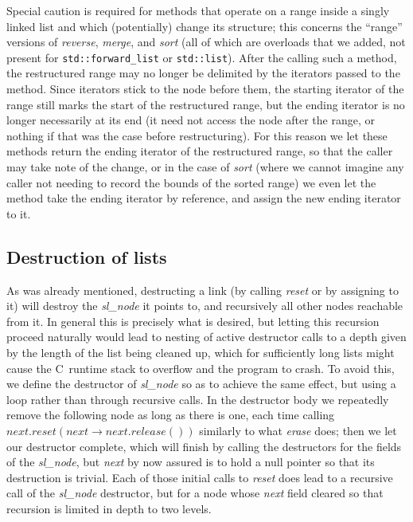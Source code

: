 \documentclass[12pt]{article}
\theoremstyle{plain}
\theoremstyle{definition}
\def\PP{\copy\PPbox}
\newcommand\Cee{\textsc{C}}
\newcommand\Cpp{\Cee\PP}
\newcommand\std[1]{\texttt{std::#1}}
\def\frwl.{\std{forward\_list}}
\begin{document}
Special caution is required for methods that operate on a range inside a singly
linked list and which (potentially) change its structure; this concerns the
``range'' versions of \textit{reverse}, \textit{merge}, and \textit{sort} (all
of which are overloads that we added, not present for \frwl. or \std{list}).
After the calling such a method, the restructured range may no longer be
delimited by the iterators passed to the method. Since iterators stick to the
node before them, the starting iterator of the range still marks the start of
the restructured range, but the ending iterator is no longer necessarily at its
end (it need not access the node after the range, or nothing if that was the
case before restructuring). For this reason we let these methods return the
ending iterator of the restructured range, so that the caller may take note of
the change, or in the case of \textit{sort} (where we cannot imagine any caller
not needing to record the bounds of the sorted range) we even let the method
take the ending iterator by reference, and assign the new ending iterator to it.


\subsection{Destruction of lists}

As was already mentioned, destructing a link (by calling \textit{reset} or by
assigning to it) will destroy the \textit{sl\_node} it points to, and
recursively all other nodes reachable from it. In general this is precisely what
is desired, but letting this recursion proceed naturally would lead to nesting
of active destructor calls to a depth given by the length of the list being
cleaned up, which for sufficiently long lists might cause the \Cpp\ runtime
stack to overflow and the program to crash. To avoid this, we define the
destructor of \textit{sl\_node} so as to achieve the same effect, but using a
loop rather than through recursive calls. In the destructor body we repeatedly
remove the following node as long as there is one, each time calling
$\textit{next}.\textit{reset}(\textit{next}\to\textit{next}.\textit{release}())$
similarly to what \textit{erase} does; then we let our destructor complete,
which will finish by calling the destructors for the fields of the
\textit{sl\_node}, but \textit{next} by now assured is to hold a null pointer
so that its destruction is trivial. Each of those initial calls to
\textit{reset} does lead to a recursive call of the \textit{sl\_node}
destructor, but for a node whose \textit{next} field cleared so that recursion
is limited in depth to two levels.
\end{document}
